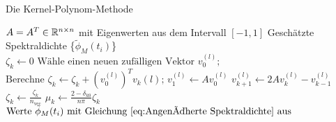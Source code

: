 \begin{algorithm}
    \caption{Die Kernel-Polynom-Methode}\label{alg:cap}
    \begin{algorithmic}[5]
    \Require $A = A^T \in \mathbb{R}^{n \times n}$ mit Eigenwerten aus dem Intervall $[-1, 1]$
    \Ensure Geschätzte Spektraldichte \{$\tilde{\phi}_M(t_i)$\}\\
    \State $\zeta_k \gets 0$
    \EndFor
    \State $\text{Wähle einen neuen zufälligen Vektor } v_0^{(l)}\text{;}$ 
    \State $\text{Berechne } \zeta_k \gets \zeta_k + \left( v_0^{(l)} \right)^T v_k{(l)}\text{;}$  
    \State $v_1^{(l)} \gets A v_0^{(l)}$
    \Else
    \State $v_{k+1}^{(l)} \gets 2 A v_k^{(l)} - v_{k-1}^{(l)}$ 
    \EndIf
    \EndFor
    \EndFor
    \State $\zeta_k \gets \frac{\zeta_k}{n_{\text{vec}}}$
    \State $\mu_k \gets \frac{2 - \delta_{k0}}{n \pi} \zeta_k$
    \EndFor
    \State $\text{Werte } \tilde{\phi}_M(t_i) \text{ mit Gleichung } \ref{eq:Angenäherte Spektraldichte} \text{ aus} $
    \end{algorithmic}
\end{algorithm}
